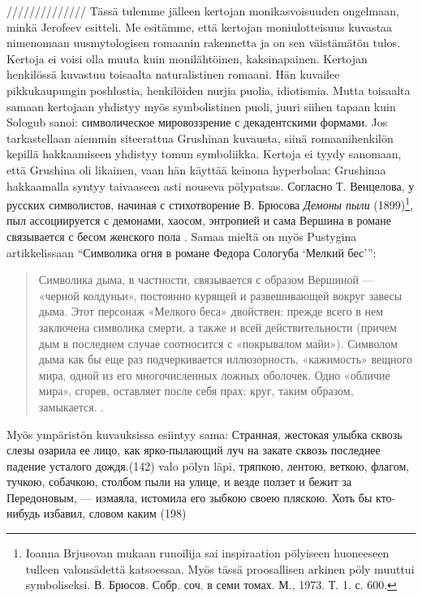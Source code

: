 \documentclass[12pt,a4paper]{article}
\begin{document}
//////////////
Tässä tulemme jälleen kertojan monikasvoisuuden ongelmaan, minkä Jerofeev esitteli. Me esitämme, että kertojan moniulotteisuus kuvastaa nimenomaan uusmytologisen romaanin rakennetta ja on sen väistämätön tulos. Kertoja ei voisi olla muuta kuin monilähtöinen, kaksinapainen. Kertojan henkilössä kuvastuu toisaalta naturalistinen romaani. Hän kuvailee pikkukaupungin poshlostia, henkilöiden nurjia puolia, idiotismia. Mutta toisaalta samaan kertojaan yhdistyy myös symbolistinen puoli, juuri siihen tapaan kuin Sologub sanoi: символическое мировоззрение с декадентскими формами. Jos tarkastellaan aiemmin siteerattua Grushinan kuvausta, siinä romaanihenkilön kepillä hakkaamiseen yhdistyy tomun symboliikka. Kertoja ei tyydy sanomaan, että Grushina oli likainen, vaan hän käyttää keinona hyperbolaa: Grushinaa hakkaamalla syntyy taivaaseen asti nouseva pölypatsas. Согласно Т. Венцелова, у русских символистов, начиная с стихотворение В. Брюсова \emph{Демоны пыли} (1899)\footnote{Ioanna Brjusovan mukaan runoilija sai inspiraation pölyiseen huoneeseen tulleen valonsädettä katsoessaa. Myös tässä proosallisen arkinen pöly muuttui symboliseksi. В. Брюсов. Собр. соч. в семи томах. М., 1973. Т. 1. с. 600.}, пыл ассоциируется с демонами, хаосом, энтропией и сама Вершина в романе связывается с бесом женского пола \parencite[42--44]{venclova2012}. Samaa mieltä on myös Pustygina artikkelissaan \enquote{Символика огня в романе Федора Сологуба \enquote{Мелкий бес}}: \begin{quote}
Символика дыма, в частности, связывается с образом Вершиной — «черной колдуньи», постоянно курящей и развешивающей вокруг завесы дыма. Этот персонаж «Мелкого беса» двойствен: прежде всего в нем заключена символика смерти, а также и всей действительности (причем дым в последнем случае соотносится с «покрывалом майи»). Символом дыма как бы еще раз подчеркивается иллюзорность, «кажимость» вещного мира, одной из его многочисленных ложных оболочек. Одно «обличие мира», сгорев, оставляет после себя прах; круг, таким образом, замыкается.
\parencite{pustygina1989}.
\end{quote}

Myös ympäristön kuvauksissa esiintyy sama:
Странная, жестокая улыбка сквозь слезы озарила ее лицо, как 
ярко-пылающий луч на закате сквозь последнее падение усталого дождя.(142) valo pölyn läpi, 
тряпкою, лентою, веткою, флагом, тучкою, собачкою, столбом пыли на улице, и везде ползет и бежит за Передоновым, — измаяла, истомила его зыбкою своею пляскою. Хоть бы кто-нибудь избавил, словом каким (198)
\end{document}
